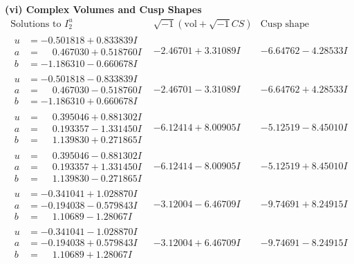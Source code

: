 \documentclass[1p]{elsarticle_modified}
\theoremstyle{definition}
\newcommand{\I}{\sqrt{-1}}
\begin{document}
\newpage\flushleft \textbf{(vi) Complex Volumes and Cusp Shapes}
$$\begin{array}{c|c|c}  
\text{Solutions to }I^u_{2}& \I (\text{vol} + \sqrt{-1}CS) & \text{Cusp shape}\\
 \hline 
\begin{aligned}
u &= -0.501818 + 0.833839 I \\
a &= \phantom{-}0.467030 + 0.518760 I \\
b &= -1.186310 - 0.660678 I\end{aligned}
 & -2.46701 + 3.31089 I & -6.64762 - 4.28533 I \\ \hline\begin{aligned}
u &= -0.501818 - 0.833839 I \\
a &= \phantom{-}0.467030 - 0.518760 I \\
b &= -1.186310 + 0.660678 I\end{aligned}
 & -2.46701 - 3.31089 I & -6.64762 + 4.28533 I \\ \hline\begin{aligned}
u &= \phantom{-}0.395046 + 0.881302 I \\
a &= \phantom{-}0.193357 - 1.331450 I \\
b &= \phantom{-}1.139830 + 0.271865 I\end{aligned}
 & -6.12414 + 8.00905 I & -5.12519 - 8.45010 I \\ \hline\begin{aligned}
u &= \phantom{-}0.395046 - 0.881302 I \\
a &= \phantom{-}0.193357 + 1.331450 I \\
b &= \phantom{-}1.139830 - 0.271865 I\end{aligned}
 & -6.12414 - 8.00905 I & -5.12519 + 8.45010 I \\ \hline\begin{aligned}
u &= -0.341041 + 1.028870 I \\
a &= -0.194038 - 0.579843 I \\
b &= \phantom{-}1.10689 - 1.28067 I\end{aligned}
 & -3.12004 - 6.46709 I & -9.74691 + 8.24915 I \\ \hline\begin{aligned}
u &= -0.341041 - 1.028870 I \\
a &= -0.194038 + 0.579843 I \\
b &= \phantom{-}1.10689 + 1.28067 I\end{aligned}
 & -3.12004 + 6.46709 I & -9.74691 - 8.24915 I \\ \hline\begin{aligned}

\end{aligned}
\end{array}$$
\end{document}

